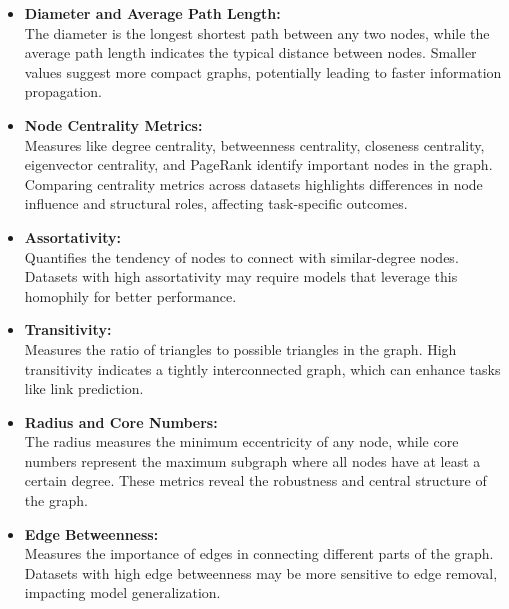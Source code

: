 \begin{itemize}
		\item \textbf{Diameter and Average Path Length:} \\
		The diameter is the longest shortest path between any two nodes, while the average path length indicates the typical distance between nodes. Smaller values suggest more compact graphs, potentially leading to faster information propagation.
		
		\item \textbf{Node Centrality Metrics:} \\
		Measures like degree centrality, betweenness centrality, closeness centrality, eigenvector centrality, and PageRank identify important nodes in the graph. Comparing centrality metrics across datasets highlights differences in node influence and structural roles, affecting task-specific outcomes.
		
		\item \textbf{Assortativity:} \\
		Quantifies the tendency of nodes to connect with similar-degree nodes. Datasets with high assortativity may require models that leverage this homophily for better performance.
		
		\item \textbf{Transitivity:} \\
		Measures the ratio of triangles to possible triangles in the graph. High transitivity indicates a tightly interconnected graph, which can enhance tasks like link prediction.
		
		\item \textbf{Radius and Core Numbers:} \\
		The radius measures the minimum eccentricity of any node, while core numbers represent the maximum subgraph where all nodes have at least a certain degree. These metrics reveal the robustness and central structure of the graph.
		
		\item \textbf{Edge Betweenness:} \\
		Measures the importance of edges in connecting different parts of the graph. Datasets with high edge betweenness may be more sensitive to edge removal, impacting model generalization.
	\end{itemize}
	

